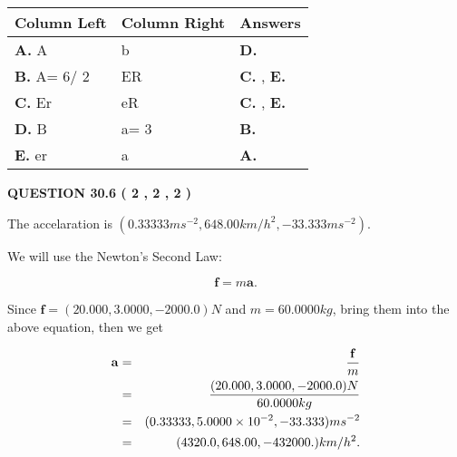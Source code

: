\documentclass[12pt]{article}
\begin{document}
  
\begin{tabular}{|l|l|l|}
 \hline
 Column Left & Column Right  & Answers       \\ 
 \hline
{\textbf{\large{
A.}}}
A
  & 
b
 & 
{\textbf{\large{
D.}}}
 \\ 
 \hline
{\textbf{\large{
B.}}}
 A= %
6/ %
2

  & 
ER
 & 
{\textbf{\large{
C.}}}
, 
{\textbf{\large{
E.}}}
 \\ 
 \hline
{\textbf{\large{
C.}}}
Er
  & 
eR
 & 
{\textbf{\large{
C.}}}
, 
{\textbf{\large{
E.}}}
 \\ 
 \hline
{\textbf{\large{
D.}}}
B
  & 
 a= %
3
 & 
{\textbf{\large{
B.}}}
 \\ 
 \hline
{\textbf{\large{
E.}}}
er
  & 
a
 & 
{\textbf{\large{
A.}}}
 \\ 
 \hline
 \end{tabular}
  
  
 
 
 
 
  
\vspace{0.2in}
  
{\textbf{\Large{QUESTION
30.6 
 (           2 ,           2 ,           2 )
}}}
  
  
 
 
\noindent{}
 
 
The accelaration is
$(
0.33333ms^{-2},
648.00km/h^2,
-33.333ms^{-2}
).
$
 
 
 
 
 
 
\noindent{}

We will use the Newton's Second Law:
 
\[
\mathbf{f}=m\mathbf{a}.
\]
 
Since $\mathbf{f}=( %
20.000,  %
3.0000,  %
-2000.0 )N$
and $m= %
60.0000kg$, bring them into the above equation, then we get
 
\begin{eqnarray*}
\mathbf{a}&=&\frac{\mathbf{f}}m  \\
&=&\frac{(
20.000 ,
3.0000 ,
-2000.0 )N
}{ %
60.0000 kg}  \\
&=&(
0.33333 ,
5.0000 \times 10^{-2},
-33.333
)ms^{-2} \\
&=&(
4320.0 ,
648.00 ,
-432000.
)km/h^2.
\end{eqnarray*}
 
\end{document}
